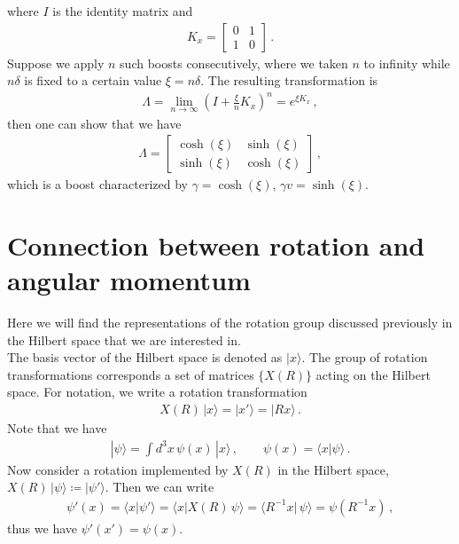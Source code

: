 \documentclass[11pt, onesided]{book}
\theoremstyle{break}
\theoremstyle{break}
\newcommand{\bmat}[1]{\begin{bmatrix} #1 \end{bmatrix}}
\begin{document}
where $I$ is the identity matrix and
\begin{align*}
K_x = \bmat{0 & 1 \\ 1 & 0}\,.
\end{align*}
Suppose we apply $n$ such boosts consecutively, where we taken $n$ to infinity while $n\delta$ is fixed to a certain value $\xi = n\delta $. The resulting transformation is
\begin{align*}
\Lambda = \lim_{n\to \infty}\left( I + \frac{\xi}{n} K_x \right)^n = e^{\xi K_x}\,,
\end{align*}
then one can show that we have
\begin{align*}
\Lambda = \bmat{
\cosh(\xi) & \sinh(\xi)\\
\sinh(\xi) & \cosh(\xi)
}\,,
\end{align*}
which is a boost characterized by $\gamma = \cosh(\xi)$, $\gamma v = \sinh(\xi)$. 


\section[Connection between rotation and angular momentum]{\color{red}Connection between rotation and angular momentum\color{black}}
Here we will find the representations of the rotation group discussed previously in the Hilbert space that we are interested in.\\

The basis vector of the Hilbert space is denoted as $|x\rangle$. The group of rotation transformations corresponds a set of matrices $\{X(R)\}$ acting on the Hilbert space. For notation, we write a rotation transformation
\begin{align*}
X(R)\, |x\rangle  = | x'\rangle = |Rx\rangle\,.
\end{align*}
Note that we have
\begin{align*}
|\psi \rangle = \int d^3x\, \psi(x) \, |x\rangle\,, \qquad \psi(x) = \langle x|\psi\rangle\,.
\end{align*}
Now consider a rotation implemented by $X(R)$ in the Hilbert space, $X(R)\, |\psi\rangle \coloneqq |\psi'\rangle$. Then we can write
\begin{align*}
\psi'(x) = \langle x | \psi'\rangle = \langle x | X(R)\, \psi\rangle = \langle R^{-1}x|\,\psi\rangle = \psi(R^{-1} x)\,,
\end{align*}
thus we have $\psi'(x') = \psi(x)$. \\
\end{document}
